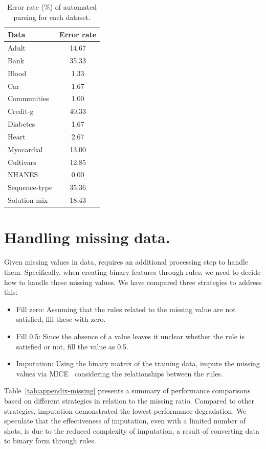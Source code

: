\documentclass{article}
\theoremstyle{plain}
\theoremstyle{definition}
\theoremstyle{remark}
\begin{document}
\begin{table}[h!]
\centering
\caption{Error rate (\%) of automated parsing for each dataset.}
\begin{tabular}{@{}lc@{}}
\toprule
Data & Error rate \\ \midrule
Adult & 14.67 \\
Bank & 35.33 \\
Blood & 1.33 \\
Car & 1.67 \\
Communities & 1.00 \\
Credit-g & 40.33 \\
Diabetes & 1.67 \\
Heart & 2.67 \\
Myocardial & 13.00 \\
Cultivars & 12.85 \\
NHANES & 0.00 \\
Sequence-type & 35.36 \\
Solution-mix & 18.43 \\ \bottomrule
\end{tabular}
\label{tab:appendix-errors}
\end{table}


\section{Handling missing data.}
Given missing values in data, \model{} requires an additional processing step to handle them. Specifically, when creating binary features through rules, we need to decide how to handle these missing values. We have compared three strategies to address this:
\begin{itemize}
    \item \textsf{Fill zero}: Assuming that the rules related to the missing value are not satisfied, fill these with zero.
    \item \textsf{Fill 0.5}: Since the absence of a value leaves it unclear whether the rule is satisfied or not, fill the value as 0.5.
    \item \textsf{Imputation}: Using the binary matrix of the training data, impute the missing values via MICE~\cite{van2011mice} considering the relationships between the rules.
\end{itemize}

Table~\ref{tab:appendix-missing} presents a summary of performance comparisons based on different strategies in relation to the missing ratio. Compared to other strategies, imputation demonstrated the lowest performance degradation. We speculate that the effectiveness of imputation, even with a limited number of shots, is due to the reduced complexity of imputation, a result of converting data to binary form through rules.
\end{document}
